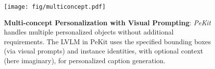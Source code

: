 

\begin{figure}[t]
 \vspace{-0.5cm}
    \centering\texttt{[image: fig/multiconcept.pdf]}
       \vspace{-0.5cm}
    \caption{\small \textbf{Multi-concept Personalization with Visual Prompting}: \textit{PeKit} handles multiple personalized objects without additional requirements. The LVLM in PeKit uses the specified bounding boxes (via visual prompts) and instance identities, with optional context (here imaginary), for personalized caption generation.} 
    \label{fig:visual_prompting}
    \vspace{-0.5cm}
\end{figure}
